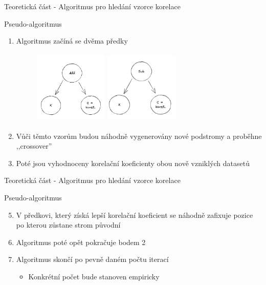 \documentclass[aspectratio=169, xcolor=dvipsnames]{beamer}
\begin{document}
\begin{frame}{Teoretická část - Algoritmus pro hledání vzorce korelace}
  \begin{block}{Pseudo-algoritmus}
    \begin{enumerate}
        \pause
      \item Algoritmus začíná se dvěma předky 
        \begin{figure}
          \pause
          \includegraphics[width=100pt, height=100pt]{assets/start-tree.png}
          \pause
          \includegraphics[width=100pt, height=100pt]{assets/start-tree-2.png}
        \end{figure}
        \pause
      \item Vůči těmto vzorům budou náhodně vygenerovány nové podstromy a proběhne ,,crossover'' 
        \pause
      \item Poté jsou vyhodnoceny korelační koeficienty obou nově vzniklých datasetů 
    \end{enumerate}
 \end{block} 
\end{frame}

\begin{frame}{Teoretická část - Algoritmus pro hledání vzorce korelace}
  \begin{block}{Pseudo-algoritmus}
    \begin{enumerate}
        \setcounter{enumi}{4}
       \item V předkovi, který získá lepší korelační koeficient se náhodně zafixuje pozice po kterou zůstane strom původní %
        \item Algoritmus poté opět pokračuje bodem 2 
       \item Algoritmus skončí po pevně daném počtu iterací 
         \begin{itemize}
            \item Konkrétní počet bude stanoven empiricky
         \end{itemize}
    \end{enumerate}
 \end{block} 
\end{frame}
\end{document}
